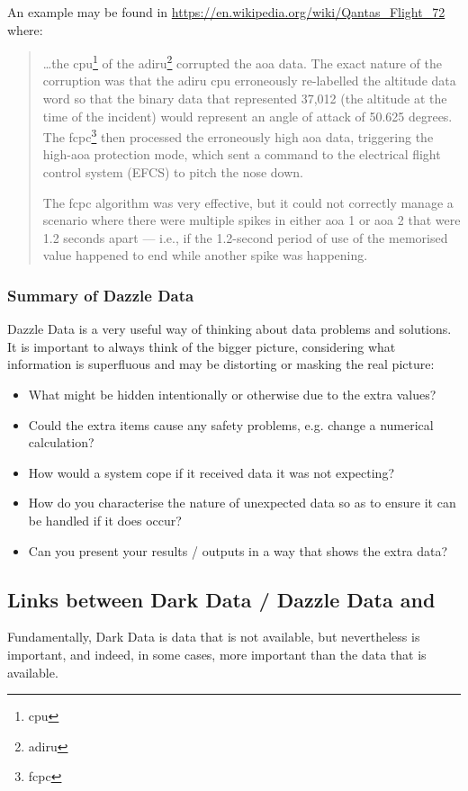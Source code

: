 An example may be found in
\href{https://en.wikipedia.org/wiki/Qantas\_Flight\_72}{https://en.wikipedia.org/wiki/Qantas\_Flight\_72}
where:
\begin{quotation}
  \dots the \acrshort{cpu}\footnote{\acrlong{cpu}} of the \acrshort{adiru}\footnote{\acrlong{adiru}} corrupted the \acrfull{aoa} data. The exact nature of the corruption was that the \acrshort{adiru} \acrshort{cpu} erroneously re-labelled the altitude data word so that the binary data that represented 37,012 (the altitude at the time of the incident) would represent an angle of attack of 50.625 degrees. The \acrshort{fcpc}\footnote{\acrlong{fcpc}} then processed the erroneously high \gls{aoa} data, triggering the high-\gls{aoa} protection mode, which sent a command to the electrical flight control system (EFCS) to pitch the nose down.
  
  The \acrshort{fcpc} algorithm was very effective, but it could not correctly manage a scenario where there were multiple spikes in either \gls{aoa} 1 or \gls{aoa} 2 that were 1.2 seconds apart --- i.e., if the 1.2-second period of use of the memorised value happened to end while another spike was happening.
  \end{quotation}
\subsubsection{Summary of Dazzle Data}
Dazzle Data is a very useful way of thinking about data problems and solutions.
It is important to always think of the bigger picture,
considering what information is superfluous and may be distorting or masking the real picture:
\begin{itemize}
    \item What might be hidden intentionally or otherwise due to the extra values?
    \item Could the extra items cause any safety problems, e.g. change a numerical calculation?
    \item How would a system cope if it received data it was not expecting?
    \item How do you characterise the nature of unexpected data so as to ensure it can be handled if it does occur?
    \item Can you present your results / outputs in a way that shows the extra data?
\end{itemize}
%
%
\subsection{Links between Dark Data / Dazzle Data and }
Fundamentally, Dark Data is data that is not available, but nevertheless is important, and indeed, in some cases, more important than the data that is available.

